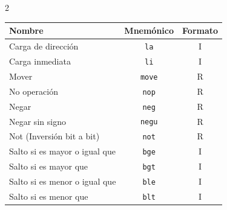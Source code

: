\documentclass[11pt, a4paper]{article}
\begin{document}
\begin{multicols*}{2}
        \begin{tcolorbox}[
        colback=white, 
        colframe=blue!40!black, 
        title= {\centering \textbf{Pseudoinstrucciones MIPS32} },
        fonttitle=\bfseries,
        size=small
        ]
            \begin{tabularx}{\linewidth}{Xcc}
                \toprule
                \textbf{Nombre} & \textbf{Mnemónico} & \textbf{Formato} \\
                \midrule
                Carga de dirección & \texttt{la} & I \\
                Carga inmediata & \texttt{li} & I \\
                Mover & \texttt{move} & R \\
                No operación & \texttt{nop} & R \\
                Negar & \texttt{neg} & R \\
                Negar sin signo & \texttt{negu} & R \\
                Not (Inversión bit a bit) & \texttt{not} & R \\
                Salto si es mayor o igual que & \texttt{bge} & I \\
                Salto si es mayor que & \texttt{bgt} & I \\
                Salto si es menor o igual que & \texttt{ble} & I \\
                Salto si es menor que & \texttt{blt} & I \\
                \bottomrule
            \end{tabularx}
        \end{tcolorbox}
        
    \end{multicols*}
\end{document}
